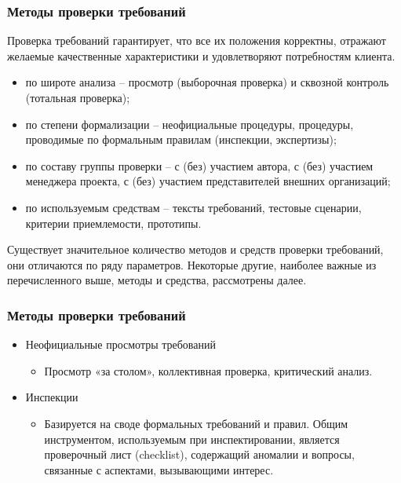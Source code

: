 \documentclass{../industrial-development}
\begin{document}
{\begin{frame} \frametitle {Методы проверки требований}
  \begin{block}{}
\alert{Проверка требований} гарантирует, что все их положения корректны, отражают желаемые качественные характеристики и удовлетворяют потребностям клиента.
  \end{block}
\begin{itemize}
\item \alert{по широте анализа} – просмотр (выборочная проверка) и сквозной контроль (тотальная проверка);
\item \alert{по степени формализации} – неофициальные процедуры, процедуры, проводимые по формальным правилам (инспекции, экспертизы);
\item \alert{по составу группы проверки} – с (без) участием автора, с (без) участием менеджера проекта, с (без) участием представителей внешних организаций;
\item \alert{по используемым средствам} – тексты требований, тестовые сценарии, критерии
приемлемости, прототипы.

\end{itemize}
\end{frame}

\lecturenotes

Существует значительное количество методов и средств проверки требований, они отличаются по ряду параметров. Некоторые другие, наиболее важные из перечисленного выше, методы и средства, рассмотрены далее.


\begin{frame} \frametitle {Методы проверки требований}

\begin{itemize}
\item \alert{Неофициальные просмотры требований}
\begin{itemize}
\item Просмотр «за столом», коллективная проверка, критический анализ.
\end{itemize}

\item  \alert{Инспекции}
\begin{itemize}
\item Базируется на своде формальных требований и правил. Общим инструментом, используемым при инспектировании, является проверочный лист (checklist), содержащий аномалии и вопросы, связанные с аспектами, вызывающими интерес.
\end{itemize}


\end{itemize}
\end{frame}}
\end{document}

